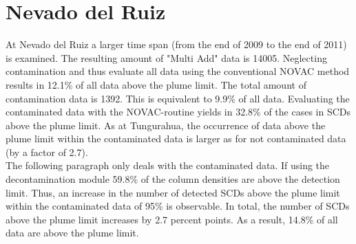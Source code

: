 \documentclass  [
  paper    = a4,
  BCOR     = 10mm,
  twoside,
  fontsize = 12pt,
  fleqn,
  toc      = bibnumbered,
  toc      = listofnumbered,
  numbers  = noendperiod,
  headings = normal,
  listof   = leveldown,
  version  = 3.03
]                                       {scrreprt}
\begin{document}



\section{Nevado del Ruiz}
At Nevado del Ruiz a larger time span (from the end of 2009 to the end of 2011) is examined. The resulting amount of "Multi Add" data is 14005.
Neglecting contamination and thus evaluate all data using the conventional NOVAC method results in 12.1\% of all data above the plume limit. 
The total amount of contamination data is 1392. This is equivalent to 9.9\% of all data. Evaluating the contaminated data with the NOVAC-routine yields in 32.8\% of the cases in  SCDs above the plume limit. As at Tungurahua, the occurrence of data above the plume limit within the contaminated data is larger as for not contaminated data (by a factor of 2.7).\\
The following paragraph only deals with the contaminated data.
If using the decontamination module 59.8\% of the  column densities are above the detection limit. Thus, an increase in the number of detected  SCDs above the plume limit within the contaminated data of 95\% is observable. In total, the number of  SCDs above the plume limit increases by 2.7 percent points. As a result, 14.8\% of all data are above the plume limit.\\
\FloatBarrier


%
%
%
\end{document}
